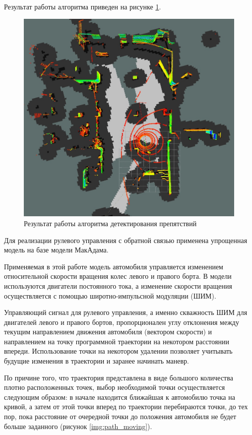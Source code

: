 Результат работы алгоритма приведен на рисунке \ref{img:obstacles_lidar}.

\begin{figure}[h]
    \centering
    \includegraphics[width=\linewidth]{images/3_devel/obstacles_lidar}
    \caption{Результат работы алгоритма детектирования препятствий}
    \label{img:obstacles_lidar}
\end{figure}

Для реализации рулевого управления с обратной связью применена упрощенная модель на базе
модели МакАдама.

Применяемая в этой работе модель автомобиля управляется изменением относительной скорости вращения
колес левого и правого борта. В модели используются двигатели постоянного тока, а изменение
скорости вращения осуществляется с помощью широтно-импульсной модуляции (ШИМ). 

Управляющий сигнал для рулевого управления, а именно скважность ШИМ для двигателей левого и правого
бортов, пропорционален углу отклонения между текущим направлением движения автомобиля (вектором скорости)
и направлением на точку программной траектории на некотором расстоянии впереди. Использование точки на
некотором удалении позволяет учитывать будущие изменения в траектории и заранее начинать маневр.

По причине того, что траектория представлена в виде большого количества плотно расположенных
точек, выбор необходимой точки осуществляется следующим образом: в начале находится ближайшая к автомобилю
точка на кривой, а затем от этой точки вперед по траектории перебираются точки, до тех пор, пока
расстояние от очередной точки до положения автомобиля не будет больше заданного (рисунок \ref{img:path_moving}).

